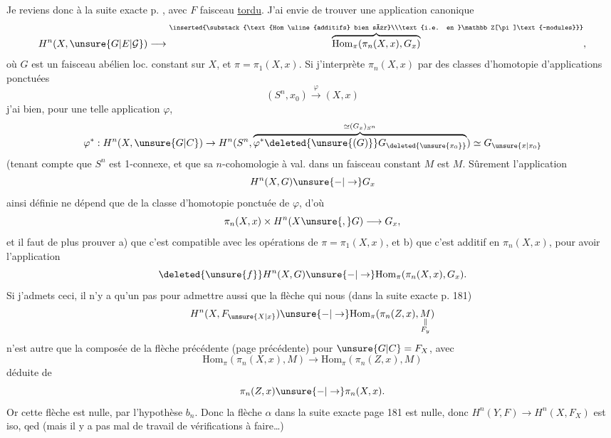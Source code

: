 Je reviens donc à la suite exacte p. , avec $F$ faisceau \uline{tordu}. J'ai envie de trouver une application canonique
\[
H^n(X,\unsure{G|E|\mathcal G})\longrightarrow\overbrace{\mathrm{Hom}_{\pi}(\pi_n(X,x),G_x)}^{\inserted{\substack{\text{Hom \uline{additifs} bien sûr}\\\text{i.e. en }\mathbb Z[\pi]\text{-modules}}}}, 
\]
où $G$ est un faisceau abélien loc. constant  sur $X$, et $\pi=\pi_1(X,x)$. Si j'interprète
$\pi_n(X,x)$ par des classes d'homotopie d'applications ponctuées
\[
(S^n,x_0)\xrightarrow{\varphi}(X,x)
\]
j'ai bien, pour une telle application $\varphi$,
\[
\varphi^*:H^n(X,\unsure{G|C})\to H^n(S^n,\overbrace{\varphi^*\deleted{\unsure{(G)}}G_{\deleted{\unsure{x_0}}}}^{\simeq(G_x)_{S^n}})\simeq G_{\unsure{x|x_0}}
\]
(tenant compte que $S^n$ est 1-connexe, et que sa $n$-cohomologie à val. dans un faisceau constant $M$ est $M$. Sûrement l'application
\[
H^n(X,G)\unsure{-|\to}G_x
\]
ainsi définie ne dépend que de la classe d'homotopie ponctuée de $\varphi$, d'où
\[
\pi_n(X,x)\times H^n(X\unsure{,}G)\longrightarrow G_x,
\]
et il faut de plus prouver a) que c'est compatible avec les opérations de $\pi=\pi_1(X,x)$, et b) que c'est additif en $\pi_n(X,x)$, pour avoir l'application 
\[
\deleted{\unsure{f}}H^n(X,G)\unsure{-|\to}\mathrm{Hom}_\pi(\pi_n(X,x),G_x).
\]
Si j'admets ceci, il n'y a qu'un pas pour admettre aussi que la flèche qui nous   (dans la suite exacte p. 181)
\[
H^n(X,F_{\unsure{X|x}})\unsure{-|\to}\mathrm{Hom}_\pi(\pi_n(Z,x),\underset{\substack{\Vert\\ F_y}}{M})
\]
n'est autre que la composée de la flèche précédente (page précédente) pour $\unsure{G|C}=F_X$, avec
\[
\mathrm{Hom}_\pi(\pi_n(X,x),M)\to\mathrm{Hom}_\pi(\pi_n(Z,x),M)
\]
déduite de
\[
\pi_n(Z,x)\unsure{-|\to}\pi_n(X,x).
\]
Or cette flèche est nulle, par l'hypothèse $b_n$. Donc la flèche $\alpha$ dans la suite exacte page 181 est nulle, donc $H^n(Y,F)\to H^n(X,F_X)$ est iso, qed (mais il y a pas mal de travail de vérifications à faire\ldots)

